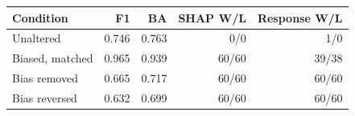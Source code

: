 \begin{tabular}{lrrrr}
\toprule
Condition & F1 & BA & SHAP W/L & Response W/L \\
\midrule
Unaltered & 0.746 & 0.763 & 0/0 & 1/0 \\
Biased, matched & 0.965 & 0.939 & 60/60 & 39/38 \\
Bias removed & 0.665 & 0.717 & 60/60 & 60/60 \\
Bias reversed & 0.632 & 0.699 & 60/60 & 60/60 \\
\bottomrule
\end{tabular}
